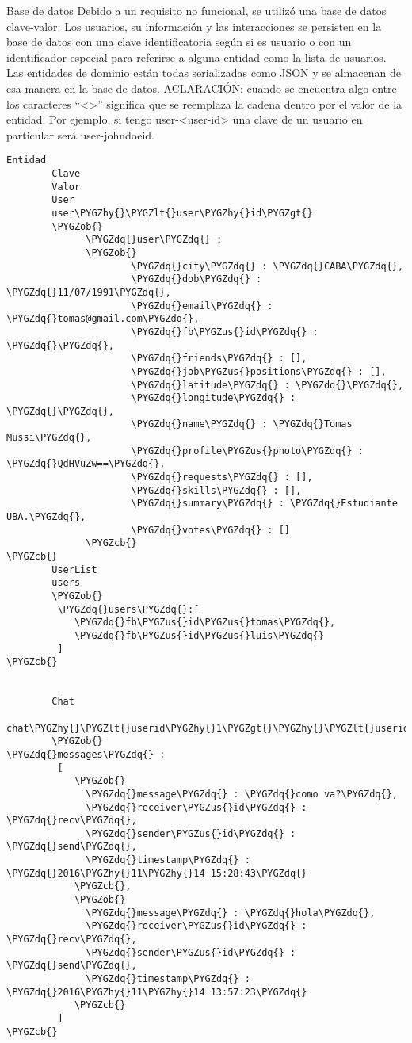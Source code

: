 \documentclass[a4paper,10pt,spanish]{sphinxmanual}
\def\PYGZus{\char`\_}
\def\PYGZob{\char`\{}
\def\PYGZcb{\char`\}}
\def\PYGZlt{\char`\<}
\def\PYGZgt{\char`\>}
\def\PYGZhy{\char`\-}
\def\PYGZdq{\char`\"}
\begin{document}
Base de datos
Debido a un requisito no funcional, se utilizó una base de datos clave-valor.
Los usuarios, su información y las interacciones se persisten en la base de datos con una clave identificatoria según si es usuario o con un identificador especial para referirse a alguna entidad como la lista de usuarios. Las entidades de dominio están todas serializadas como JSON y se almacenan de esa manera en la base de datos.
ACLARACIÓN: cuando se encuentra algo entre los caracteres “\textless{}\textgreater{}” significa que se reemplaza la cadena dentro por el valor de la entidad. Por ejemplo, si tengo user-\textless{}user-id\textgreater{} una clave de un usuario en particular será user-johndoeid.

\begin{Verbatim}[commandchars=\\\{\}]
Entidad
        Clave
        Valor
        User
        user\PYGZhy{}\PYGZlt{}user\PYGZhy{}id\PYGZgt{}
        \PYGZob{}
              \PYGZdq{}user\PYGZdq{} :
              \PYGZob{}
                      \PYGZdq{}city\PYGZdq{} : \PYGZdq{}CABA\PYGZdq{},
                      \PYGZdq{}dob\PYGZdq{} : \PYGZdq{}11/07/1991\PYGZdq{},
                      \PYGZdq{}email\PYGZdq{} : \PYGZdq{}tomas@gmail.com\PYGZdq{},
                      \PYGZdq{}fb\PYGZus{}id\PYGZdq{} : \PYGZdq{}\PYGZdq{},
                      \PYGZdq{}friends\PYGZdq{} : [],
                      \PYGZdq{}job\PYGZus{}positions\PYGZdq{} : [],
                      \PYGZdq{}latitude\PYGZdq{} : \PYGZdq{}\PYGZdq{},
                      \PYGZdq{}longitude\PYGZdq{} : \PYGZdq{}\PYGZdq{},
                      \PYGZdq{}name\PYGZdq{} : \PYGZdq{}Tomas Mussi\PYGZdq{},
                      \PYGZdq{}profile\PYGZus{}photo\PYGZdq{} : \PYGZdq{}QdHVuZw==\PYGZdq{},
                      \PYGZdq{}requests\PYGZdq{} : [],
                      \PYGZdq{}skills\PYGZdq{} : [],
                      \PYGZdq{}summary\PYGZdq{} : \PYGZdq{}Estudiante UBA.\PYGZdq{},
                      \PYGZdq{}votes\PYGZdq{} : []
              \PYGZcb{}
\PYGZcb{}
        UserList
        users
        \PYGZob{}
         \PYGZdq{}users\PYGZdq{}:[
            \PYGZdq{}fb\PYGZus{}id\PYGZus{}tomas\PYGZdq{},
            \PYGZdq{}fb\PYGZus{}id\PYGZus{}luis\PYGZdq{}
         ]
\PYGZcb{}


        Chat
        chat\PYGZhy{}\PYGZlt{}userid\PYGZhy{}1\PYGZgt{}\PYGZhy{}\PYGZlt{}userid2\PYGZgt{}
        \PYGZob{}
\PYGZdq{}messages\PYGZdq{} :
         [
            \PYGZob{}
              \PYGZdq{}message\PYGZdq{} : \PYGZdq{}como va?\PYGZdq{},
              \PYGZdq{}receiver\PYGZus{}id\PYGZdq{} : \PYGZdq{}recv\PYGZdq{},
              \PYGZdq{}sender\PYGZus{}id\PYGZdq{} : \PYGZdq{}send\PYGZdq{},
              \PYGZdq{}timestamp\PYGZdq{} : \PYGZdq{}2016\PYGZhy{}11\PYGZhy{}14 15:28:43\PYGZdq{}
            \PYGZcb{},
            \PYGZob{}
              \PYGZdq{}message\PYGZdq{} : \PYGZdq{}hola\PYGZdq{},
              \PYGZdq{}receiver\PYGZus{}id\PYGZdq{} : \PYGZdq{}recv\PYGZdq{},
              \PYGZdq{}sender\PYGZus{}id\PYGZdq{} : \PYGZdq{}send\PYGZdq{},
              \PYGZdq{}timestamp\PYGZdq{} : \PYGZdq{}2016\PYGZhy{}11\PYGZhy{}14 13:57:23\PYGZdq{}
            \PYGZcb{}
         ]
\PYGZcb{}
\end{Verbatim}
\end{document}
